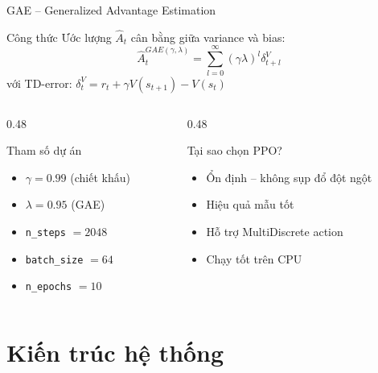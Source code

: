 \documentclass[aspectratio=169, 11pt]{beamer}
\begin{document}
\begin{frame}{GAE -- Generalized Advantage Estimation}
  \begin{block}{Công thức}
    Ước lượng $\hat{A}_t$ cân bằng giữa variance và bias:
    $$\hat{A}_t^{GAE(\gamma,\lambda)} = \sum_{l=0}^{\infty}(\gamma\lambda)^l \delta_{t+l}^V$$
    với TD-error: $\delta_t^V = r_t + \gamma V(s_{t+1}) - V(s_t)$
  \end{block}

  \vspace{6pt}
  \begin{columns}[T]
    \begin{column}{0.48\textwidth}
      \begin{exampleblock}{Tham số dự án}
        \begin{itemize}
          \item $\gamma = 0.99$ (chiết khấu)
          \item $\lambda = 0.95$ (GAE)
          \item \texttt{n\_steps} $= 2048$
          \item \texttt{batch\_size} $= 64$
          \item \texttt{n\_epochs} $= 10$
        \end{itemize}
      \end{exampleblock}
    \end{column}
    \begin{column}{0.48\textwidth}
      \begin{alertblock}{Tại sao chọn PPO?}
        \begin{itemize}
          \item Ổn định -- không sụp đổ đột ngột
          \item Hiệu quả mẫu tốt
          \item Hỗ trợ MultiDiscrete action
          \item Chạy tốt trên CPU
        \end{itemize}
      \end{alertblock}
    \end{column}
  \end{columns}
\end{frame}

\section{Kiến trúc hệ thống}
\end{document}
